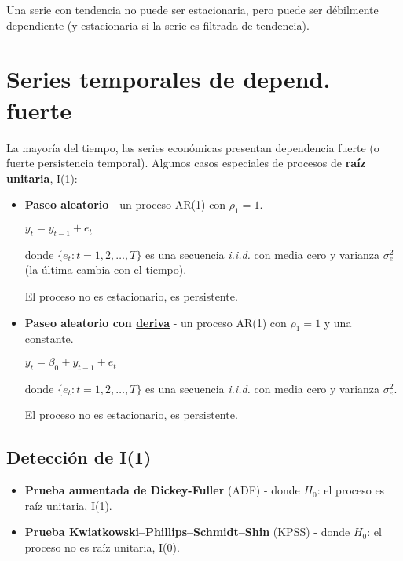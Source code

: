 \documentclass[10pt, a4paper, landscape]{extarticle}
\begin{document}
\begin{multicols}{3}
Una serie con tendencia no puede ser estacionaria, pero puede ser débilmente dependiente (y estacionaria si la serie es filtrada de tendencia).

\columnbreak

\section*{Series temporales de depend. fuerte}

La mayoría del tiempo, las series económicas presentan dependencia fuerte (o fuerte persistencia temporal). Algunos casos especiales de procesos de \textbf{raíz unitaria}, I(1):

\begin{itemize}[leftmargin=*]
		\item \textbf{Paseo aleatorio} - un proceso AR(1) con $\rho_1 = 1$.
	\begin{center}
		$y_t = y_{t - 1} + e_t$
	\end{center}
	donde $\lbrace e_t : t = 1, 2, \ldots, T \rbrace$ es una secuencia \textsl{i.i.d.} con media cero y varianza $\sigma^2_e$ (la última cambia con el tiempo).
	
		El proceso no es estacionario, es persistente.
	
	\item \textbf{Paseo aleatorio con \href{https://www.youtube.com/watch?v=pS5d77DQHOI}{deriva}} - un proceso AR(1) con $\rho_1 = 1$ y una constante.
	\begin{center}
		$y_t = \beta_0 + y_{t - 1} + e_t$
	\end{center}
	donde $\lbrace e_t : t = 1, 2, \ldots, T \rbrace$ es una secuencia \textsl{i.i.d.} con media cero y varianza $\sigma^2_e$.

	El proceso no es estacionario, es persistente.
\end{itemize}

\subsection*{Detección de I(1)}

\begin{itemize}[leftmargin=*]
	\item \textbf{Prueba aumentada de Dickey-Fuller} (ADF) - donde $H_0$: el proceso es raíz unitaria, I(1).
	\item \textbf{Prueba Kwiatkowski–Phillips–Schmidt–Shin} (KPSS) - donde $H_0$: el proceso no es raíz unitaria, I(0).
\end{itemize}


\end{multicols}
\end{document}
